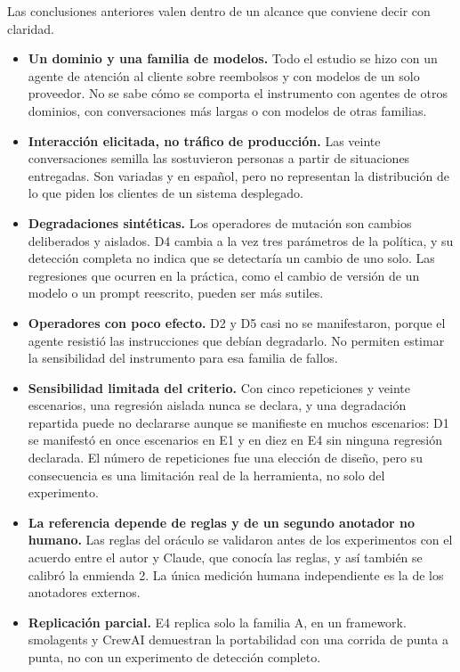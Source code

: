 Las conclusiones anteriores valen dentro de un alcance que conviene decir con claridad.
\par
\begin{itemize}[leftmargin=0.5in,itemsep=0pt,parsep=0pt,topsep=0pt]
  \item \textbf{Un dominio y una familia de modelos.} Todo el estudio se hizo con un agente de atención al cliente sobre reembolsos y con modelos de un solo proveedor. No se sabe cómo se comporta el instrumento con agentes de otros dominios, con conversaciones más largas o con modelos de otras familias.
  \item \textbf{Interacción elicitada, no tráfico de producción.} Las veinte conversaciones semilla las sostuvieron personas a partir de situaciones entregadas. Son variadas y en español, pero no representan la distribución de lo que piden los clientes de un sistema desplegado.
  \item \textbf{Degradaciones sintéticas.} Los operadores de mutación son cambios deliberados y aislados. D4 cambia a la vez tres parámetros de la política, y su detección completa no indica que se detectaría un cambio de uno solo. Las regresiones que ocurren en la práctica, como el cambio de versión de un modelo o un prompt reescrito, pueden ser más sutiles.
  \item \textbf{Operadores con poco efecto.} D2 y D5 casi no se manifestaron, porque el agente resistió las instrucciones que debían degradarlo. No permiten estimar la sensibilidad del instrumento para esa familia de fallos.
  \item \textbf{Sensibilidad limitada del criterio.} Con cinco repeticiones y veinte escenarios, una regresión aislada nunca se declara, y una degradación repartida puede no declararse aunque se manifieste en muchos escenarios: D1 se manifestó en once escenarios en E1 y en diez en E4 sin ninguna regresión declarada. El número de repeticiones fue una elección de diseño, pero su consecuencia es una limitación real de la herramienta, no solo del experimento.
  \item \textbf{La referencia depende de reglas y de un segundo anotador no humano.} Las reglas del oráculo se validaron antes de los experimentos con el acuerdo entre el autor y Claude, que conocía las reglas, y así también se calibró la enmienda 2. La única medición humana independiente es la de los anotadores externos.
  \item \textbf{Replicación parcial.} E4 replica solo la familia A, en un framework. smolagents y CrewAI demuestran la portabilidad con una corrida de punta a punta, no con un experimento de detección completo.

\end{itemize}
